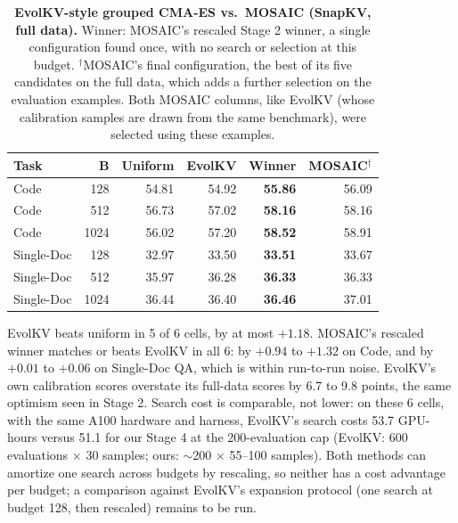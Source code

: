 \documentclass[11pt]{article}
\begin{document}
\begin{table}[t]
  \centering
  \footnotesize
  \setlength{\tabcolsep}{2.4pt}
  \begin{tabular}{@{} l r r r r r @{}}
    \toprule
    \textbf{Task} & \textbf{B} & \textbf{Uniform} & \textbf{EvolKV} & \textbf{Winner} & \textbf{MOSAIC}$^\dagger$ \\
    \midrule
    \rowcolor{gray!10}
    Code       & 128  & 54.81 & 54.92 & \textbf{55.86} & 56.09 \\
    Code       & 512  & 56.73 & 57.02 & \textbf{58.16} & 58.16 \\
    \rowcolor{gray!10}
    Code       & 1024 & 56.02 & 57.20 & \textbf{58.52} & 58.91 \\
    Single-Doc & 128  & 32.97 & 33.50 & \textbf{33.51} & 33.67 \\
    \rowcolor{gray!10}
    Single-Doc & 512  & 35.97 & 36.28 & \textbf{36.33} & 36.33 \\
    Single-Doc & 1024 & 36.44 & 36.40 & \textbf{36.46} & 37.01 \\
    \bottomrule
  \end{tabular}
  \caption{\textbf{EvolKV-style grouped CMA-ES vs.\ MOSAIC (SnapKV, full data).} Winner: MOSAIC's rescaled Stage 2 winner, a single configuration found once, with no search or selection at this budget. $^\dagger$MOSAIC's final configuration, the best of its five candidates on the full data, which adds a further selection on the evaluation examples. Both MOSAIC columns, like EvolKV (whose calibration samples are drawn from the same benchmark), were selected using these examples.}
  \label{tab:ablation}
\end{table}

EvolKV beats uniform in 5 of 6 cells, by at most $+1.18$. MOSAIC's rescaled winner matches or beats EvolKV in all 6: by $+0.94$ to $+1.32$ on Code, and by $+0.01$ to $+0.06$ on Single-Doc QA, which is within run-to-run noise. EvolKV's own calibration scores overstate its full-data scores by 6.7 to 9.8 points, the same optimism seen in Stage 2. Search cost is comparable, not lower: on these 6 cells, with the same A100 hardware and harness, EvolKV's search costs 53.7 GPU-hours versus 51.1 for our Stage 4 at the 200-evaluation cap (EvolKV: 600 evaluations $\times$ 30 samples; ours: $\sim$200 $\times$ 55--100 samples). Both methods can amortize one search across budgets by rescaling, so neither has a cost advantage per budget; a comparison against EvolKV's expansion protocol (one search at budget 128, then rescaled) remains to be run.
\end{document}
